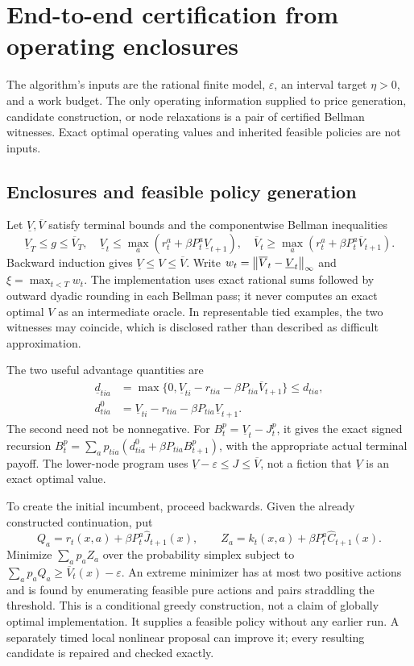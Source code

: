 \section{End-to-end certification from operating enclosures}\label{sec:finite48}
The algorithm's inputs are the rational finite model, $\varepsilon$, an interval target $\eta>0$, and a work budget. The only operating information supplied to price generation, candidate construction, or node relaxations is a pair of certified Bellman witnesses. Exact optimal operating values and inherited feasible policies are not inputs.

\subsection{Enclosures and feasible policy generation}
Let $\underline V,\overline V$ satisfy terminal bounds and the componentwise Bellman inequalities
\begin{equation}\label{eq:witness48}
 \underline V_T\le g\le\overline V_T,\quad
 \underline V_t\le\max_a(r_t^a+\beta P_t^a\underline V_{t+1}),\quad
 \overline V_t\ge\max_a(r_t^a+\beta P_t^a\overline V_{t+1}).
\end{equation}
Backward induction gives $\underline V\le V\le\overline V$. Write $w_t=\left\|\overline V_t-\underline V_t\right\|_\infty$ and $\xi=\max_{t<T}w_t$. The implementation uses exact rational sums followed by outward dyadic rounding in each Bellman pass; it never computes an exact optimal $V$ as an intermediate oracle. In representable tied examples, the two witnesses may coincide, which is disclosed rather than described as difficult approximation.

The two useful advantage quantities are
\begin{align}
 \underline d_{tia}&=\max\{0,\underline V_{ti}-r_{tia}-\beta P_{tia}\overline V_{t+1}\}\le d_{tia},\label{eq:dlo48}\\
 d^0_{tia}&=\underline V_{ti}-r_{tia}-\beta P_{tia}\underline V_{t+1}.\label{eq:dzero48}
\end{align}
The second need not be nonnegative. For $B_t^p=\underline V_t-J_t^p$, it gives the exact signed recursion $B_t^p=\sum_a p_{tia}(d^0_{tia}+\beta P_{tia}B_{t+1}^p)$, with the appropriate actual terminal payoff. The lower-node program uses $\underline V-\varepsilon\le J\le\overline V$, not a fiction that $\underline V$ is an exact optimal value.

To create the initial incumbent, proceed backwards. Given the already constructed continuation, put
\[
 Q_a=r_t(x,a)+\beta P_t^a\widehat J_{t+1}(x),\qquad
 Z_a=k_t(x,a)+\beta P_t^a\widehat C_{t+1}(x).
\]
Minimize $\sum_a p_aZ_a$ over the probability simplex subject to $\sum_a p_aQ_a\ge\overline V_t(x)-\varepsilon$. An extreme minimizer has at most two positive actions and is found by enumerating feasible pure actions and pairs straddling the threshold. This is a conditional greedy construction, not a claim of globally optimal implementation. It supplies a feasible policy without any earlier run. A separately timed local nonlinear proposal can improve it; every resulting candidate is repaired and checked exactly.


